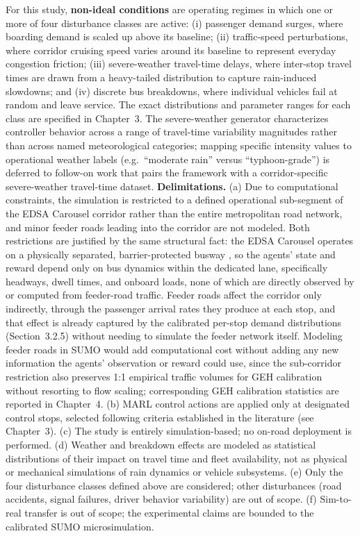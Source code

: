 For this study, \textbf{non-ideal conditions} are operating regimes in which one or more of four disturbance classes are active: (i) passenger demand surges, where boarding demand is scaled up above its baseline; (ii) traffic-speed perturbations, where corridor cruising speed varies around its baseline to represent everyday congestion friction; (iii) severe-weather travel-time delays, where inter-stop travel times are drawn from a heavy-tailed distribution to capture rain-induced slowdowns; and (iv) discrete bus breakdowns, where individual vehicles fail at random and leave service. The exact distributions and parameter ranges for each class are specified in Chapter~3. The severe-weather generator characterizes controller behavior across a range of travel-time variability magnitudes rather than across named meteorological categories; mapping specific intensity values to operational weather labels (e.g.\ ``moderate rain'' versus ``typhoon-grade'') is deferred to follow-on work that pairs the framework with a corridor-specific severe-weather travel-time dataset.
\clearpage
\textbf{Delimitations.} (a) Due to computational constraints, the simulation is restricted to a defined operational sub-segment of the EDSA Carousel corridor rather than the entire metropolitan road network, and minor feeder roads leading into the corridor are not modeled. Both restrictions are justified by the same structural fact: the EDSA Carousel operates on a physically separated, barrier-protected busway \cite{Chua2026}, so the agents' state and reward depend only on bus dynamics within the dedicated lane, specifically headways, dwell times, and onboard loads, none of which are directly observed by or computed from feeder-road traffic. Feeder roads affect the corridor only indirectly, through the passenger arrival rates they produce at each stop, and that effect is already captured by the calibrated per-stop demand distributions (Section~3.2.5) without needing to simulate the feeder network itself. Modeling feeder roads in SUMO would add computational cost without adding any new information the agents' observation or reward could use, since the sub-corridor restriction also preserves 1:1 empirical traffic volumes for GEH calibration without resorting to flow scaling; corresponding GEH calibration statistics are reported in Chapter~4. (b) MARL control actions are applied only at designated control stops, selected following criteria established in the literature (see Chapter~3). (c) The study is entirely simulation-based; no on-road deployment is performed. (d) Weather and breakdown effects are modeled as statistical distributions of their impact on travel time and fleet availability, not as physical or mechanical simulations of rain dynamics or vehicle subsystems. (e) Only the four disturbance classes defined above are considered; other disturbances (road accidents, signal failures, driver behavior variability) are out of scope. (f) Sim-to-real transfer is out of scope; the experimental claims are bounded to the calibrated SUMO microsimulation.